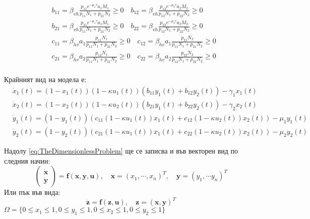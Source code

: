 \begin{equation}
  \begin{split}
    &b_{11} = \beta_{vh} \frac{p_{11} e^{-\mu_1 \tau} a_1 M_1}{p_{11} N_1 + p_{21} N_2} \geq 0 \quad
    b_{12} = \beta_{vh} \frac{p_{12} e^{-\mu_2 \tau} a_2 M_2}{p_{12} N_1 + p_{22} N_2} \geq 0 \\
    &b_{21} = \beta_{vh} \frac{p_{21} e^{-\mu_1 \tau} a_1 M_1}{p_{11} N_1 + p_{21} N_2} \geq 0 \quad
    b_{22} = \beta_{vh} \frac{p_{22} e^{-\mu_2 \tau} a_2 M_2}{p_{12} N_1 + p_{22} N_2} \geq 0 \\
    &c_{11} = \beta_{hv} a_1 \frac{p_{11} N_1}{p_{11} N_1 + p_{21} N_2} \geq 0 \quad
    c_{12} = \beta_{hv} a_1 \frac{p_{21} N_2}{p_{11} N_1 + p_{21} N_2} \geq 0 \\
    &c_{21} = \beta_{hv} a_2 \frac{p_{12} N_1}{p_{11} N_1 + p_{21} N_2} \geq 0 \quad
    c_{22} = \beta_{hv} a_2 \frac{p_{22} N_2}{p_{12} N_1 + p_{22} N_2} \geq 0 \\
  \end{split}
\end{equation}

Крайният вид на модела е:
\begin{equation}
  \label{eq:TheDimensionlessProblem}
  \begin{split}
    &\dot{x}_1(t) = (1-x_1(t)) (1-\kappa u_1(t)) \left(b_{11} y_1(t) + b_{12} y_2(t)\right) - \gamma_1 x_1(t) \\
    &\dot{x}_2(t) = (1-x_2(t)) (1-\kappa u_2(t))\left(b_{21} y_1(t) + b_{22} y_2(t)\right) - \gamma_2 x_2(t) \\
    &\dot{y}_1(t) = (1-y_1(t)) \left(c_{11}(1-\kappa u_1(t)) x_1(t) + c_{12}(1-\kappa u_2(t)) x_2(t)\right) - \mu_1 y_1(t) \\
    &\dot{y}_2(t) = (1-y_2(t)) \left(c_{21}(1-\kappa u_1(t)) x_1(t) + c_{22} (1-\kappa u_2(t)) x_2(t)\right) - \mu_2 y_2(t)
  \end{split}
\end{equation}

Надолу \ref{eq:TheDimensionlessProblem} ще се записва и във векторен вид по следния начин:
\begin{equation}
  \begin{pmatrix}
    \dot{\mathbf{x}} \\
    \dot{\mathbf{y}}
  \end{pmatrix}
  =
  \mathbf{f}(\mathbf{x}, \mathbf{y}, \mathbf{u}), \quad
  \mathbf{x} = (x_1, \cdots, x_n)^T, \quad \mathbf{y} = (y_1, \cdots y_n)^T
\end{equation}
Или пък във вида:
\begin{equation}
  \dot{\mathbf{z}} = \mathbf{f}(\mathbf{z}, \mathbf{u}), \quad \mathbf{z} = (\mathbf{x}, \mathbf{y})^T
\end{equation}
$\Omega = \{0 \leq x_1 \leq 1, 0 \leq y_1 \leq 1, 0 \leq x_2 \leq 1, 0 \leq y_2 \leq 1\}$

